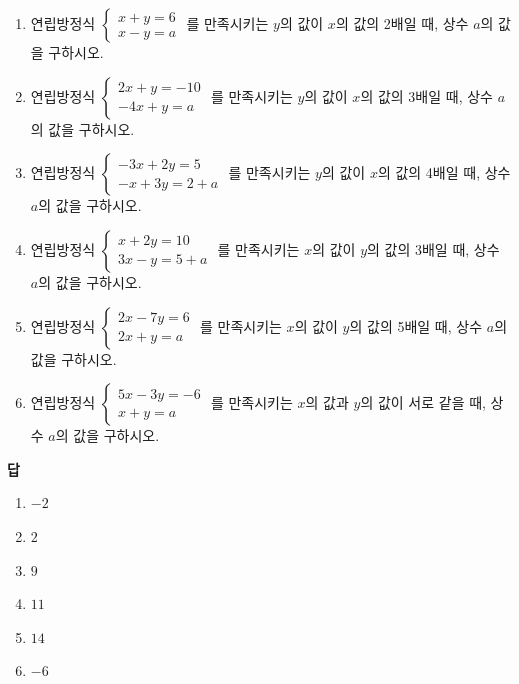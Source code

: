 \documentclass{article}
\begin{document}
\newpage
\section{}

\begin{enumerate}[label=(\arabic*), itemsep=50pt]
    \item
    연립방정식
    \(\begin{cases}
        x+y=6\\
        x-y=a
    \end{cases}\)
    를 만족시키는 $y$의 값이 $x$의 값의 2배일 때, 상수 $a$의 값을 구하시오.
    \item
    연립방정식
    \(\begin{cases}
        2x+y=-10\\
        -4x+y=a
    \end{cases}\)
    를 만족시키는 $y$의 값이 $x$의 값의 3배일 때, 상수 $a$의 값을 구하시오.
    \item
    연립방정식
    \(\begin{cases}
        -3x+2y=5\\
        -x+3y=2+a
    \end{cases}\)
    를 만족시키는 $y$의 값이 $x$의 값의 4배일 때, 상수 $a$의 값을 구하시오.
    \item
    연립방정식
    \(\begin{cases}
        x+2y=10\\
        3x-y=5+a
    \end{cases}\)
    를 만족시키는 $x$의 값이 $y$의 값의 3배일 때, 상수 $a$의 값을 구하시오.
    \item
    연립방정식
    \(\begin{cases}
        2x-7y=6\\
        2x+y=a
    \end{cases}\)
    를 만족시키는 $x$의 값이 $y$의 값의 5배일 때, 상수 $a$의 값을 구하시오.
    \item
    연립방정식
    \(\begin{cases}
        5x-3y=-6\\
        x+y=a
    \end{cases}\)
    를 만족시키는 $x$의 값과 $y$의 값이 서로 같을 때, 상수 $a$의 값을 구하시오.
\end{enumerate}

\vspace*{\fill}
\noindent\textbf{답}
\begin{enumerate}[label=(\arabic*)]
    \item \(-2\)
    \item \(2\)
    \item \(9\)
    \item \(11\)
    \item \(14\)
    \item \(-6\)
\end{enumerate}
\end{document}
